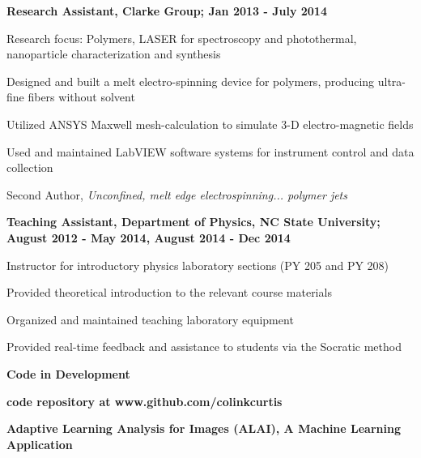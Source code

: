 \documentclass[letterpaper,final]{memoir}
\newcommand{\LargeSep}{\vspace{1.3em}}
\newcommand{\Sep}{\vspace{1.0em}}
\newcommand{\SmallSep}{\vspace{0.4em}}
\newcommand{\CVSection}[1]
	{\LARGE\textbf{#1}\par
	\SmallSep\normalsize}
\newcommand{\CVItem}[1]
	{\textbf{\color{Blue} #1}}
\begin{document}
\Sep

\CVItem{Research Assistant, Clarke Group; Jan 2013 - July 2014}
\begin{compactitem}[\color{Blue}$\circ$]
    
    \SmallSep

    \item Research focus: Polymers, LASER for spectroscopy and photothermal, nanoparticle characterization and synthesis
    \item Designed and built a melt electro-spinning device for polymers, producing ultra-fine fibers without solvent
    \item Utilized ANSYS Maxwell mesh-calculation to simulate 3-D electro-magnetic fields
    \item Used and maintained LabVIEW software systems for instrument control and data collection
    \item Second Author, \textit{Unconfined, melt edge electrospinning... polymer jets}

\end{compactitem}

\Sep

\CVItem{Teaching Assistant, Department of Physics, NC State University; August 2012 - May 2014, August 2014 - Dec 2014}
\begin{compactitem}[\color{Blue}$\circ$]

    \SmallSep
	
    \item Instructor for introductory physics laboratory sections (PY 205 and PY 208)
    \item Provided theoretical introduction to the relevant course materials
    \item Organized and maintained teaching laboratory equipment
    \item Provided real-time feedback and assistance to students via the Socratic method
\end{compactitem}

\LargeSep


\notoserif \CVSection{Code in Development}

\normalfont

\Sep

\CVItem{code repository at www.github.com/colinkcurtis} 

\Sep

\CVItem{Adaptive Learning Analysis for Images (ALAI), A Machine Learning Application} 
\end{document}
